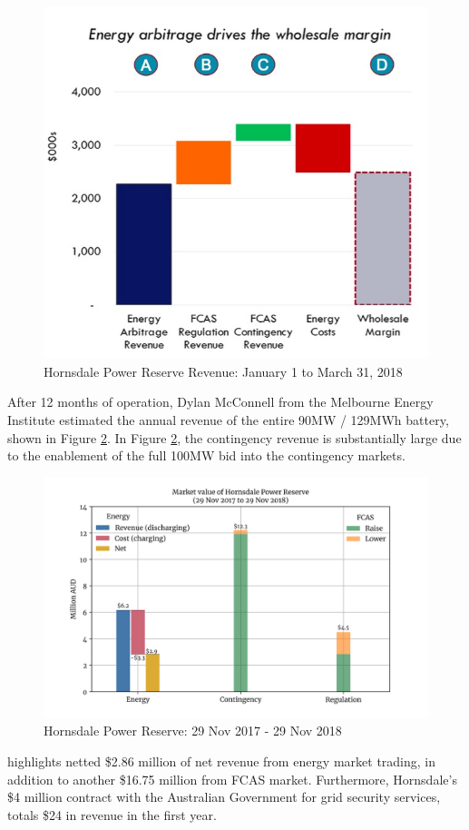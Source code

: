 \begin{figure}[H]
    \centering
    \includegraphics[width=.6\textwidth]{Pictures/Chapter2/hpr_first_3_months.jpg}
    \caption{Hornsdale Power Reserve Revenue: January 1 to March 31, 2018}
    \label{fig:hpr_3_mon_rev}
\end{figure}
After 12 months of operation, Dylan McConnell from the Melbourne Energy Institute estimated the annual revenue of the entire 90MW / 129MWh battery, shown in Figure \ref{fig:hpr_12_mon_rev}. In Figure \ref{fig:hpr_12_mon_rev}, the contingency revenue is substantially large due to the enablement of the full 100MW bid into the contingency markets. 
\begin{figure}[H]
    \centering
    \includegraphics[width=.8\textwidth]{Pictures/Chapter2/hpr_revenue.png}
    \caption{Hornsdale Power Reserve: 29 Nov 2017 - 29 Nov 2018}
    \label{fig:hpr_12_mon_rev}
\end{figure}
\parencite{hornsdale_savings} highlights netted \$2.86 million of net revenue from energy market trading, in addition to another \$16.75 million from FCAS market. Furthermore, Hornsdale's \$4 million contract with the Australian Government for grid security services, totals \$24 in revenue in the first year. 

